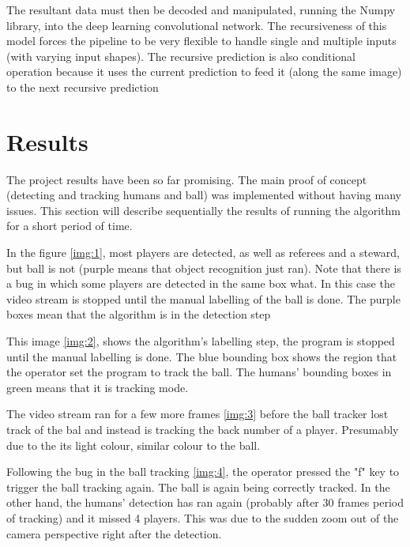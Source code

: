 \documentclass[
    11pt,
    oneside
]{report}
\begin{document}
The resultant data must then be decoded and manipulated, running the Numpy library, into the deep learning convolutional network. The recursiveness of this model forces the pipeline to be very flexible to handle single and multiple inputs (with varying input shapes). The recursive prediction is also conditional operation because it uses the current prediction to feed it (along the same image) to the next recursive prediction



\section{Results}

The project results have been so far promising. The main proof of concept (detecting and tracking humans and ball) was implemented without having many issues. This section will describe sequentially the results of running the algorithm for a short period of time.



In the figure \ref{img:1}, most players are detected, as well as referees and a steward, but ball is not (purple means that object recognition just ran). Note that there is a bug in which some players are detected in the same box what. In this case the video stream is stopped until the manual labelling of the ball is done. The purple boxes mean that the algorithm is in the detection step



This image \ref{img:2}, shows the algorithm's labelling step, the program is stopped until the manual labelling is done. The blue bounding box shows the region that the operator set the program to track the ball. The humans' bounding boxes in green means that it is tracking mode.



The video stream ran for a few more frames \ref{img:3} before the ball tracker lost track of the bal and instead is tracking the back number of a player. Presumably due to the its light colour, similar colour to the ball.



Following the bug in the ball tracking \ref{img:4}, the operator pressed the "f" key to trigger the ball tracking again. The ball is again being correctly tracked. In the other hand, the humans' detection has ran again (probably after 30 frames period of tracking) and it missed 4 players. This was due to the sudden zoom out of the camera perspective right after the detection.
\end{document}
